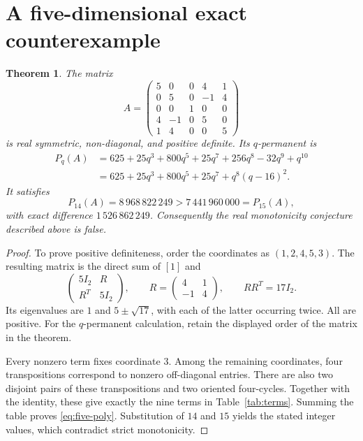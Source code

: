 \documentclass[11pt]{article}
\newtheorem{theorem}{Theorem}
\begin{document}
\section{A five-dimensional exact counterexample}
\begin{theorem}\label{thm:five}
The matrix
\[
 A=\begin{pmatrix}
 5&0&0&4&1\\
 0&5&0&-1&4\\
 0&0&1&0&0\\
 4&-1&0&5&0\\
 1&4&0&0&5
 \end{pmatrix}
\]
is real symmetric, non-diagonal, and positive definite. Its $q$-permanent is
\begin{align}\label{eq:five-poly}
 P_q(A)
 &=625+25q^3+800q^5+25q^7+256q^8-32q^9+q^{10}\\
 &=625+25q^3+800q^5+25q^7+q^8(q-16)^2.\nonumber
\end{align}
It satisfies
\[
 P_{14}(A)=8\,968\,822\,249
 >7\,441\,960\,000=P_{15}(A),
\]
with exact difference $1\,526\,862\,249$. Consequently the real monotonicity conjecture described above is false.
\end{theorem}
\begin{proof}
To prove positive definiteness, order the coordinates as $(1,2,4,5,3)$. The resulting matrix is the direct sum of $[1]$ and
\[
 \begin{pmatrix}5I_2&R\\R^T&5I_2\end{pmatrix},\qquad
 R=\begin{pmatrix}4&1\\-1&4\end{pmatrix},\qquad RR^T=17I_2.
\]
Its eigenvalues are $1$ and $5\pm\sqrt{17}$, with each of the latter occurring twice. All are positive. For the $q$-permanent calculation, retain the displayed order of the matrix in the theorem.

Every nonzero term fixes coordinate $3$. Among the remaining coordinates, four transpositions correspond to nonzero off-diagonal entries. There are also two disjoint pairs of these transpositions and two oriented four-cycles. Together with the identity, these give exactly the nine terms in Table~\ref{tab:terms}. Summing the table proves \eqref{eq:five-poly}. Substitution of $14$ and $15$ yields the stated integer values, which contradict strict monotonicity.
\end{proof}
\end{document}
